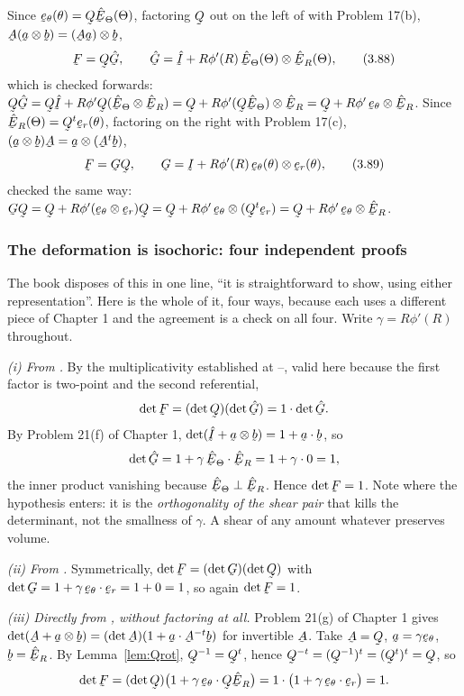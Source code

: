 Since $\bet(\theta)=\bQ\hETh(\Theta)$, factoring $\bQ$ out on the left of
 with Problem 17(b), $\bA(\ba\otimes\bb)=(\bA\ba)\otimes\bb$,
\begin{equation}
   \bF=\bQ\hat\bG,\qquad
   \hat\bG=\hI+R\phi'(R)\,\hETh(\Theta)\otimes\hER(\Theta),
   \tag{3.88}\label{eq:3.88}
\end{equation}
which is checked forwards:
$\bQ\hat\bG=\bQ\hI+R\phi'\bQ(\hETh\otimes\hER)
=\bQ+R\phi'(\bQ\hETh)\otimes\hER=\bQ+R\phi'\,\bet\otimes\hER$.
Since $\hER(\Theta)=\bQ^{t}\ber(\theta)$, factoring on the right with
Problem 17(c), $(\ba\otimes\bb)\bA=\ba\otimes(\bA^{t}\bb)$,
\begin{equation}
   \bF=\bG\bQ,\qquad
   \bG=\I+R\phi'(R)\,\bet(\theta)\otimes\ber(\theta),
   \tag{3.89}\label{eq:3.89}
\end{equation}
checked the same way:
$\bG\bQ=\bQ+R\phi'(\bet\otimes\ber)\bQ
=\bQ+R\phi'\,\bet\otimes(\bQ^{t}\ber)=\bQ+R\phi'\,\bet\otimes\hER$.

\subsubsection*{The deformation is isochoric: four independent proofs}

The book disposes of this in one line, ``it is straightforward to show,
using either representation''. Here is the whole of it, four ways, because
each uses a different piece of Chapter 1 and the agreement is a check on
all four. Write $\gamma=R\phi'(R)$ throughout.

\smallskip\noindent
\emph{(i) From .} By the multiplicativity established at
--, valid here because the first factor is two-point and
the second referential,
\[
   \det\bF=(\det\bQ)(\det\hat\bG)=1\cdot\det\hat\bG .
\]
By Problem 21(f) of Chapter 1, $\det(\hI+\ba\otimes\bb)=1+\ip\ba\bb$, so
\[
   \det\hat\bG=1+\gamma\,\ip{\hETh}{\hER}=1+\gamma\cdot0=1 ,
\]
the inner product vanishing because $\hETh\perp\hER$. Hence $\det\bF=1$.
Note where the hypothesis enters: it is the \emph{orthogonality of the
shear pair} that kills the determinant, not the smallness of $\gamma$. A
shear of any amount whatever preserves volume.

\smallskip\noindent
\emph{(ii) From .} Symmetrically,
$\det\bF=(\det\bG)(\det\bQ)$ with
$\det\bG=1+\gamma\,\ip{\bet}{\ber}=1+0=1$, so again $\det\bF=1$.

\smallskip\noindent
\emph{(iii) Directly from , without factoring at all.} Problem
21(g) of Chapter 1 gives $\det(\bA+\ba\otimes\bb)
=(\det\bA)(1+\ip{\ba}{\bA^{-t}\bb})$ for invertible $\bA$. Take
$\bA=\bQ$, $\ba=\gamma\bet$, $\bb=\hER$. By Lemma~\ref{lem:Qrot},
$\bQ^{-1}=\bQ^{t}$, hence $\bQ^{-t}=(\bQ^{-1})^{t}=(\bQ^{t})^{t}=\bQ$, so
\[
   \det\bF=(\det\bQ)\big(1+\gamma\,\ip{\bet}{\bQ\hER}\big)
          =1\cdot\big(1+\gamma\,\ip{\bet}{\ber}\big)=1 .
\]

